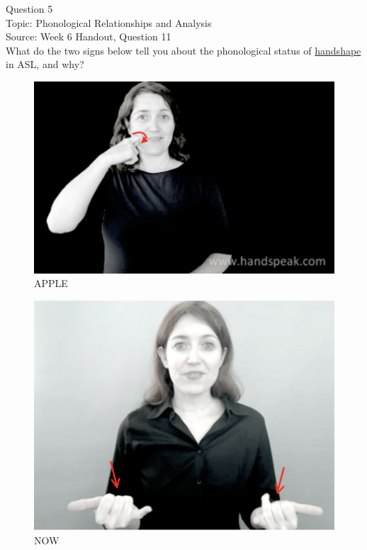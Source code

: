 \documentclass[12pt]{article}
\begin{document}
\newpage

{\large Question 5}\\

Topic: Phonological Relationships and Analysis\\
Source: Week 6 Handout, Question 11\\

What do the two signs below tell you about the phonological status of \underline{handshape} in ASL, and why?\\

\begin{figure}[H]
\includegraphics{../images/asl_apple.png}
\caption{APPLE}
\end{figure}
\begin{figure}[H]
\includegraphics{../images/asl_now.png}
\caption{NOW}
\end{figure}
\end{document}
